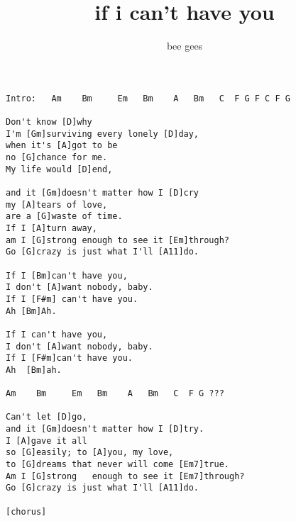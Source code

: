 \author{bee gees}
\title{if i can't have you}
\maketitle
\begin{verbatim}
Intro:   Am    Bm     Em   Bm    A   Bm   C  F G F C F G
 
Don't know [D]why  
I'm [Gm]surviving every lonely [D]day,  
when it's [A]got to be  
no [G]chance for me.  
My life would [D]end,  
 
and it [Gm]doesn't matter how I [D]cry
my [A]tears of love,  
are a [G]waste of time.  
If I [A]turn away,  
am I [G]strong enough to see it [Em]through?  
Go [G]crazy is just what I'll [A11]do.
 
If I [Bm]can't have you,  
I don't [A]want nobody, baby.  
If I [F#m] can't have you.  
Ah [Bm]Ah.  
 
If I can't have you,  
I don't [A]want nobody, baby.  
If I [F#m]can't have you.  
Ah  [Bm]ah.
 
Am    Bm     Em   Bm    A   Bm   C  F G ???

Can't let [D]go,  
and it [Gm]doesn't matter how I [D]try.  
I [A]gave it all  
so [G]easily; to [A]you, my love,  
to [G]dreams that never will come [Em7]true.  
Am I [G]strong   enough to see it [Em7]through?  
Go [G]crazy is just what I'll [A11]do.  
 
[chorus]
\end{verbatim}